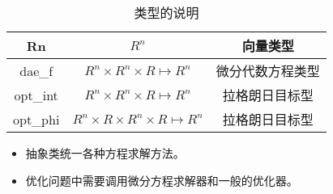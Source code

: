 \documentclass[a4]{ctexart}
\begin{document}
\begin{table}[h]
\centering  %
\caption{类型的说明}  %
\label{table1}  %
\begin{tabular}{|c|c|c|} 
\hline
Rn     &    $R^n$     &           向量类型  \\
\hline
dae\_f &   $R^n\times R^n\times R \mapsto R^n$ & 微分代数方程类型\\
 \hline
  opt\_int & $R^n\times R^n\times R\mapsto R^n$  & 拉格朗日目标型\\
 \hline
 opt\_phi   & $ R^n\times R\times R^n\times R\mapsto R^n$  & 拉格朗日目标型\\
 \hline
\end{tabular}
\end{table}



\begin{itemize}
\item 抽象类统一各种方程求解方法。
\item 优化问题中需要调用微分方程求解器和一般的优化器。
\end{itemize}
\end{document}
